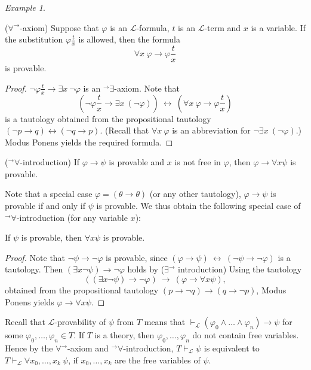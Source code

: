 \documentclass[a4paper, 11pt]{amsart}
\theoremstyle{remark}
\newtheorem{example}[example]{Example}
\newcommand{\cL}{\mathcal L}
\newenvironment{enumerate-(1)}{\begin{enumerate}[label={\upshape (\arabic*)}, leftmargin=2pc]}{\end{enumerate}}
\begin{document}
\begin{example} \ 
\begin{enumerate-(1)} 
\item 
($\forall^\rightarrow$-axiom) 
Suppose that $\varphi$ is an $\cL$-formula, $t$ is an $\cL$-term and $x$ is a variable.
 If the substitution $ \varphi \frac{t}{x}$ is allowed, then the formula 
$$ \forall x\ \varphi \rightarrow \varphi \frac{t}{x} $$ 
is provable. 
\begin{proof} 
$\neg \varphi \frac{t}{x} \rightarrow \exists x\ \neg \varphi$ is an ${}^\rightarrow\exists$-axiom. 
Note that 
$$  (\neg \varphi \frac{t}{x} \rightarrow \exists x\ (\neg \varphi )) \  \longleftrightarrow \  ( \forall x\ \varphi \rightarrow \varphi \frac{t}{x} ) $$ 
is a tautology obtained from the propositional tautology $ (\neg p \rightarrow q)  \leftrightarrow  (\neg q \rightarrow p) $. 
(Recall that $ \forall x\ \varphi $ is an abbreviation for  $\neg \exists x\  (\neg \varphi )$.) 
Modus Ponens yields the required formula. 
\end{proof} 

\item 
(${}^\rightarrow\forall$-introduction) 
If $\varphi\rightarrow \psi$ is provable and $x$ is not free in $\varphi$, then $\varphi \rightarrow \forall x \psi$ is provable. 

Note that a special case $\varphi=(\theta\rightarrow \theta)$ (or any other tautology), $\varphi\rightarrow \psi$ is provable if and only if $\psi$ is provable. 
We thus obtain the following special case of ${}^\rightarrow\forall$-introduction (for any variable $x$): 

If $\psi$ is provable, then $\forall x \psi$ is provable. 


\begin{proof} 
Note that $\neg \psi \rightarrow \neg \varphi$ is provable, since $(\varphi\rightarrow \psi)\  \leftrightarrow \ (\neg \psi \rightarrow \neg \varphi)$ is a tautology. 
Then 
$(\exists x \neg \psi) \rightarrow \neg \varphi$ holds by ($\exists^\rightarrow$ introduction) 
Using the tautology 
$$ ( (\exists x \neg \psi) \rightarrow \neg \varphi ) \  \longrightarrow \  ( \varphi \rightarrow \forall x \psi ), $$ 
obtained from the propositional tautology $ ( p \rightarrow \neg q)  \rightarrow  ( q \rightarrow \neg p) $, Modus Ponens yields $\varphi \rightarrow \forall x \psi$. 
\end{proof} 

\medskip 
\noindent 
Recall that $\cL$-provability of $\psi$ from $T$ means that $\vdash_\cL (\varphi_0\wedge \dots \wedge \varphi_n)\rightarrow \psi$ for some $\varphi_0,\dots,\varphi_n\in T$. 
If $T$ is a theory, then $\varphi_0,\dots,\varphi_n$ do not contain free variables. 
Hence by the $\forall^\rightarrow$-axiom and ${}^\rightarrow\forall$-introduction, $T\vdash_\cL \psi$ is equivalent to $T\vdash_\cL \forall x_0,\dots,x_k\ \psi$, if $x_0,\dots,x_k$ are the free variables of $\psi$. 
\medskip 



\end{enumerate-(1)}
\end{example}
\end{document}

